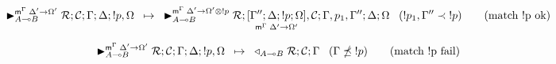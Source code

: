 \begin{align}
\trans{\matstate{A \lolli B}{\rulestk}{\lstack{C}}{\Gamma}{\Delta}{\bang p,
   \Omega}{\Delta' \rightarrow \Omega'}}
{\matstate{A \lolli B}{\rulestk}{\pframe{\Gamma''}{\Delta}{\bang
   p}{\Omega}{\Delta'}{\Omega'}, \lstack{C}}{\Gamma, p_1,
      \Gamma''}{\Delta}{\Omega}{\Delta' \rightarrow \Omega' \otimes \bang p}}
      \;\;\; (\bang p_1, \Gamma'' \prec \bang p) \tag{match \bang p ok}
\end{align}

\begin{align}
\trans{\matstate{A \lolli B}{\rulestk}{\lstack{C}}{\Gamma}{\Delta}{\bang p,
   \Omega}{\Delta' \rightarrow \Omega'}}
{\contstate{A \lolli B}{\rulestk}{\lstack{C}}{\Gamma}} \;\;\; (\Gamma \npreceq
      \bang p) \tag{match \bang p fail}
\end{align}
